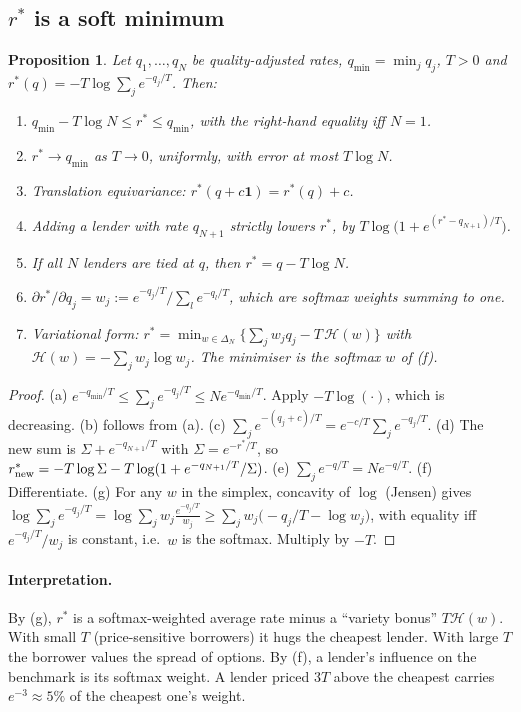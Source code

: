 \documentclass[11pt,a4paper]{article}
\newtheorem{proposition}{Proposition}[section]
\theoremstyle{remark}
\newcommand{\rs}{r^{*}}
\newcommand{\one}{\mathbf{1}}
\begin{document}
\subsection{$\rs$ is a soft minimum}
\begin{proposition}\label{prop:softmin}
Let $q_1,\dots,q_N$ be quality-adjusted rates, $q_{\min}=\min_j q_j$, $T>0$ and
$\rs(q)=-T\log\sum_j e^{-q_j/T}$. Then:
\begin{enumerate}
\item[(a)] $q_{\min}-T\log N\le \rs\le q_{\min}$, with the right-hand equality iff $N=1$.
\item[(b)] $\rs\to q_{\min}$ as $T\to0$, uniformly, with error at most $T\log N$.
\item[(c)] Translation equivariance: $\rs(q+c\one)=\rs(q)+c$.
\item[(d)] Adding a lender with rate $q_{N+1}$ strictly lowers $\rs$, by
$T\log\!\big(1+e^{(\rs-q_{N+1})/T}\big)$.
\item[(e)] If all $N$ lenders are tied at $q$, then $\rs=q-T\log N$.
\item[(f)] $\partial\rs/\partial q_j=w_j:=e^{-q_j/T}/\sum_l e^{-q_l/T}$, which are softmax weights summing to one.
\item[(g)] Variational form: $\rs=\min_{w\in\Delta_N}\big\{\sum_j w_jq_j-T\,\mathcal H(w)\big\}$ with
$\mathcal H(w)=-\sum_j w_j\log w_j$. The minimiser is the softmax $w$ of (f).
\end{enumerate}
\end{proposition}
\begin{proof}
(a) $e^{-q_{\min}/T}\le\sum_j e^{-q_j/T}\le Ne^{-q_{\min}/T}$. Apply $-T\log(\cdot)$, which is decreasing.
(b) follows from (a). (c) $\sum_j e^{-(q_j+c)/T}=e^{-c/T}\sum_je^{-q_j/T}$.
(d) The new sum is $\Sigma+e^{-q_{N+1}/T}$ with $\Sigma=e^{-\rs/T}$, so
$\rs_{\rm new}=-T\log\Sigma-T\log(1+e^{-q_{N+1}/T}/\Sigma)$.
(e) $\sum_je^{-q/T}=Ne^{-q/T}$. (f) Differentiate.
(g) For any $w$ in the simplex, concavity of $\log$ (Jensen) gives
$\log\sum_j e^{-q_j/T}=\log\sum_j w_j\frac{e^{-q_j/T}}{w_j}\ge\sum_j w_j\big(-q_j/T-\log w_j\big)$,
with equality iff $e^{-q_j/T}/w_j$ is constant, i.e.\ $w$ is the softmax. Multiply by $-T$.
\end{proof}

\paragraph{Interpretation.} By (g), $\rs$ is a softmax-weighted average rate minus a ``variety bonus''
$T\mathcal H(w)$. With small $T$ (price-sensitive borrowers) it hugs the cheapest lender. With large $T$
the borrower values the spread of options. By (f), a lender's influence on the benchmark is its
softmax weight. A lender priced $3T$ above the cheapest carries $e^{-3}\approx5\%$ of the
cheapest one's weight.
\end{document}
